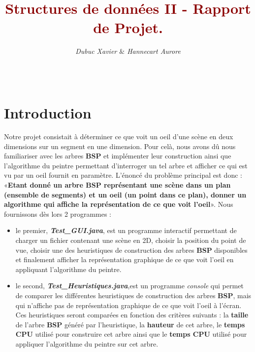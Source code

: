 \documentclass{article}
\title{\textbf{\textcolor{darkred}{Structures de données II - Rapport de Projet.}}}
\author{\textit{Dubuc Xavier $\&$ Hannecart Aurore}}
\begin{document}
\maketitle

\hbox{\raisebox{0.4em}{\vrule depth 0.4pt height 0.4pt width 10cm}}

\tableofcontents

$ $ \\
\hbox{\raisebox{0.4em}{\vrule depth 0.4pt height 0.4pt width 10cm}}

\newpage

\section{Introduction}

Notre projet consistait à déterminer ce que voit un oeil d'une scène en deux dimensions sur un segment en une dimension. Pour celà, nous avons dû nous familiariser avec les arbres
\textbf{BSP} et implémenter leur construction ainsi que l'algorithme du peintre permettant d'interroger un tel arbre et afficher ce qui est vu par un oeil fournit en paramètre.  
L'énoncé du problème principal est donc : «\textbf{Etant donné un arbre BSP représentant une scène dans un plan (ensemble de segments) et un oeil (un point dans ce plan), 
donner un algorithme qui affiche la représentation de ce que voit l'oeil}». Nous fournissons dès lors 2 programmes :
\begin{itemize}
\item le premier, \textit{\textbf{Test\_GUI.java}}, est un programme interactif permettant de charger un fichier contenant une scène en 2D, choisir la position du point de vue, 
choisir une des heuristiques de construction des arbres \textbf{BSP} disponibles et finalement afficher la représentation graphique de ce que voit l'oeil en appliquant l'algorithme 
du peintre.
\item le second, \textbf{\textit{Test\_Heuristiques.java}},est un programme \textit{console} qui permet de comparer les différentes heuristiques de construction des arbres 
\textbf{BSP}, mais qui n'affiche pas de représentation graphique de ce que voit l'oeil à l'écran. Ces heuristiques seront comparées en fonction des critères suivants : la 
\textbf{taille} de l'arbre \textbf{BSP} généré par l'heuristique, la \textbf{hauteur} de cet arbre, le \textbf{temps CPU} utilisé pour construire cet arbre ainsi que le 
\textbf{temps CPU} utilisé pour appliquer l'algorithme du peintre sur cet arbre.
\end{itemize}
\end{document}
